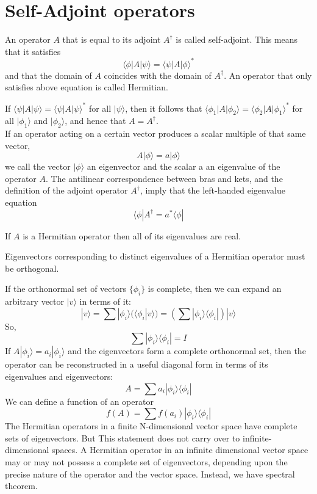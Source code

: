 \documentclass[cyan]{elegantnote}
\begin{document}
\section{Self-Adjoint operators}
\begin{newdef}
An operator $A$ that is equal to its adjoint $A^{\dagger}$ is called self-adjoint. This means that it satisfies
\[\langle \phi | A | \psi \rangle  = \langle \psi | A | \phi \rangle^*\]
and that the domain of $A$ coincides with the domain of $A^{\dagger}$. An operator that only satisfies above equation is called Hermitian.
\end{newdef}

\begin{newthem}
If $\langle \psi | A | \psi \rangle  = \langle \psi | A | \psi \rangle^*$ for all $| \psi \rangle$, then it follows that $\langle \phi_1 | A | \phi_2 \rangle  = \langle \phi_2 | A | \phi_1 \rangle^*$ for all $|\phi_1\rangle$ and $|\phi_2\rangle$, and hence that $A = A^{\dagger}$.\\
If an operator acting on a certain vector produces a scalar multiple of that same vector,
\[ A |\phi \rangle = a |\phi \rangle\]
we call the vector $| \phi \rangle$ an eigenvector and the scalar a an eigenvalue of the operator $A$. The antilinear correspondence between bras and kets, and the definition of the adjoint operator $A^{\dagger}$, imply that the left-handed eigenvalue equation
\[\langle \phi | A^{\dagger} = a^{*} \langle \phi |\]
\end{newthem}

\begin{newthem}
 If $A$ is a Hermitian operator then all of its eigenvalues are real.
\end{newthem}

\begin{newthem}
Eigenvectors corresponding to distinct eigenvalues of a Hermitian operator must be orthogonal.
\end{newthem}

\noindent
If the orthonormal set of vectors $\{ \phi_i \}$ is complete, then we can expand an arbitrary vector $|v\rangle$ in terms of it:
\[ |v\rangle = \sum | \phi_i \rangle (\langle \phi_i | v \rangle) = \left( \sum |\phi_i \rangle \langle \phi_i | \right) | v\rangle\]
So,
\[ \sum |\phi_i \rangle \langle \phi_i | = I\]
If $A |\phi_i \rangle = a_i |\phi_i\rangle$ and the eigenvectors form a complete orthonormal set, then the operator can be reconstructed in a useful diagonal form in terms of its eigenvalues and eigenvectors:
\[A = \sum a_i |\phi_i \rangle \langle \phi_i |\]
We can define a function of an operator
\[f(A) =  \sum f(a_i) |\phi_i \rangle \langle \phi_i |\]
The Hermitian operators in a finite N-dimensional vector space have complete sets of eigenvectors. But This statement does not carry over to infinite-dimensional spaces. A Hermitian operator in an infinite dimensional vector space may or may not possess a complete set of eigenvectors, depending upon the precise nature of the operator and the vector space. Instead, we have spectral theorem.
\end{document}
